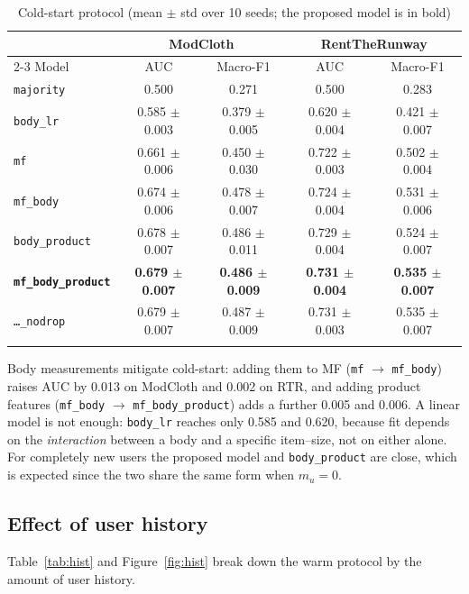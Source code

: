 \begin{table}[h]
\caption{Cold-start protocol (mean $\pm$ std over 10 seeds; the proposed model is in bold)}\label{tab:cold}
\begin{tabular*}{\textwidth}{@{\extracolsep\fill}lcccc}
\toprule
 & \multicolumn{2}{c}{ModCloth} & \multicolumn{2}{c}{RentTheRunway} \\
\cmidrule{2-3}\cmidrule{4-5}
Model & AUC & Macro-F1 & AUC & Macro-F1 \\
\midrule
\texttt{majority} & 0.500 & 0.271 & 0.500 & 0.283 \\
\texttt{body\_lr} & 0.585 $\pm$ 0.003 & 0.379 $\pm$ 0.005 & 0.620 $\pm$ 0.004 & 0.421 $\pm$ 0.007 \\
\texttt{mf} & 0.661 $\pm$ 0.006 & 0.450 $\pm$ 0.030 & 0.722 $\pm$ 0.003 & 0.502 $\pm$ 0.004 \\
\texttt{mf\_body} & 0.674 $\pm$ 0.006 & 0.478 $\pm$ 0.007 & 0.724 $\pm$ 0.004 & 0.531 $\pm$ 0.006 \\
\texttt{body\_product} & 0.678 $\pm$ 0.007 & 0.486 $\pm$ 0.011 & 0.729 $\pm$ 0.004 & 0.524 $\pm$ 0.007 \\
\textbf{\texttt{mf\_body\_product}} & \textbf{0.679 $\pm$ 0.007} & \textbf{0.486 $\pm$ 0.009} & \textbf{0.731 $\pm$ 0.004} & \textbf{0.535 $\pm$ 0.007} \\
\texttt{\dots\_nodrop} & 0.679 $\pm$ 0.007 & 0.487 $\pm$ 0.009 & 0.731 $\pm$ 0.003 & 0.535 $\pm$ 0.007 \\
\botrule
\end{tabular*}
\end{table}

Body measurements mitigate cold-start: adding them to MF (\texttt{mf} $\rightarrow$ \texttt{mf\_body}) raises AUC by 0.013 on ModCloth and 0.002 on RTR, and adding product features (\texttt{mf\_body} $\rightarrow$ \texttt{mf\_body\_product}) adds a further 0.005 and 0.006. A linear model is not enough: \texttt{body\_lr} reaches only 0.585 and 0.620, because fit depends on the \emph{interaction} between a body and a specific item--size, not on either alone. For completely new users the proposed model and \texttt{body\_product} are close, which is expected since the two share the same form when $m_u = 0$.

\subsection{Effect of user history}
Table~\ref{tab:hist} and Figure~\ref{fig:hist} break down the warm protocol by the amount of user history.

